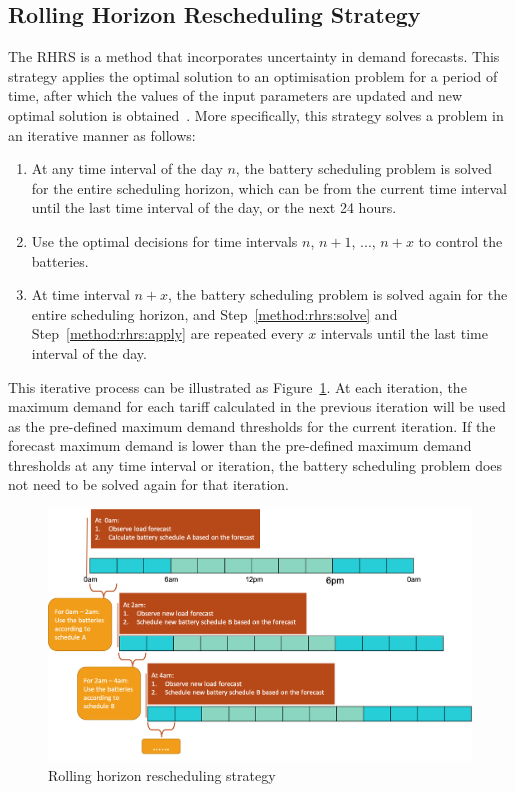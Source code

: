 \subsection{Rolling Horizon Rescheduling Strategy}
\label{method:rhrs}

The \gls{RHRS} is a method that incorporates uncertainty in demand forecasts. This strategy applies the optimal solution to an optimisation problem for a period of time, after which the values of the input parameters are updated and new optimal solution is obtained~\cite{Marietta2014}. More specifically, this strategy solves a problem in an iterative manner as follows:

\begin{enumerate}
	\item At any time interval of the day $n$, the battery scheduling problem is solved for the entire scheduling horizon, which can be from the current time interval until the last time interval of the day, or the next 24 hours. \label{method:rhrs:solve}
	
	\item Use the optimal decisions for time intervals $n$, $n + 1$, ..., $n + x$ to control the batteries. \label{method:rhrs:apply}
	
	\item At time interval $n + x$, the battery scheduling problem is solved again for the entire scheduling horizon, and Step~\ref{method:rhrs:solve} and Step~\ref{method:rhrs:apply} are repeated every $x$ intervals until the last time interval of the day. 
\end{enumerate}
This iterative process can be illustrated as Figure~\ref{fig:rolling-horizon}.
At each iteration, the maximum demand for each tariff calculated in the previous iteration will be used as the pre-defined maximum demand thresholds for the current iteration. If the forecast maximum demand is lower than the pre-defined maximum demand thresholds at any time interval or iteration, the battery scheduling problem does not need to be solved again for that iteration. 

\begin{figure}[tbh]
	\centering
	\includegraphics[width=1\linewidth]{rolling-horizon}
	\caption{Rolling horizon rescheduling strategy}
	\label{fig:rolling-horizon}
\end{figure}


